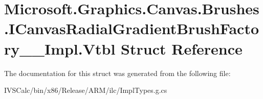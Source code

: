 \hypertarget{struct_microsoft_1_1_graphics_1_1_canvas_1_1_brushes_1_1_i_canvas_radial_gradient_brush_factory_____impl_1_1_vtbl}{}\section{Microsoft.\+Graphics.\+Canvas.\+Brushes.\+I\+Canvas\+Radial\+Gradient\+Brush\+Factory\+\_\+\+\_\+\+Impl.\+Vtbl Struct Reference}
\label{struct_microsoft_1_1_graphics_1_1_canvas_1_1_brushes_1_1_i_canvas_radial_gradient_brush_factory_____impl_1_1_vtbl}


The documentation for this struct was generated from the following file\+:\begin{DoxyCompactItemize}
\item 
I\+V\+S\+Calc/bin/x86/\+Release/\+A\+R\+M/ilc/Impl\+Types.\+g.\+cs\end{DoxyCompactItemize}
